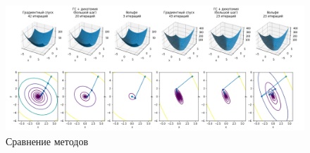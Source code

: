 \begin{landscape}
\begin{vplace}[1.0]    
\begin{figure}[ht]
    \centering
    \includegraphics[width=1.5\textwidth]{images/w4.png}
    \caption{Сравнение методов}
    \label{fig:w4}
\end{figure}
\end{vplace}
\end{landscape}

\endinput